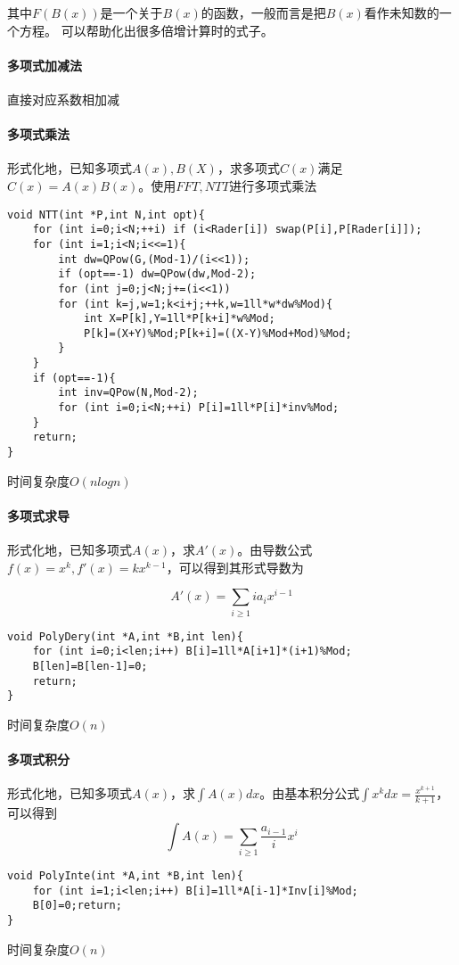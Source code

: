 \documentclass[UTF-8]{ctexart}
\begin{document}
	其中$F(B(x))$是一个关于$B(x)$的函数，一般而言是把$B(x)$看作未知数的一个方程。  
	可以帮助化出很多倍增计算时的式子。
	
	\paragraph{多项式加减法} 直接对应系数相加减
	
	\paragraph{多项式乘法} 形式化地，已知多项式$A(x),B(X)$，求多项式$C(x)$满足$C(x)=A(x)B(x)$。使用$FFT,NTT$进行多项式乘法
\begin{verbatim}
void NTT(int *P,int N,int opt){
    for (int i=0;i<N;++i) if (i<Rader[i]) swap(P[i],P[Rader[i]]);
    for (int i=1;i<N;i<<=1){
        int dw=QPow(G,(Mod-1)/(i<<1));
        if (opt==-1) dw=QPow(dw,Mod-2);
        for (int j=0;j<N;j+=(i<<1))
        for (int k=j,w=1;k<i+j;++k,w=1ll*w*dw%Mod){
            int X=P[k],Y=1ll*P[k+i]*w%Mod;
            P[k]=(X+Y)%Mod;P[k+i]=((X-Y)%Mod+Mod)%Mod;
        }
    }
    if (opt==-1){
        int inv=QPow(N,Mod-2);
        for (int i=0;i<N;++i) P[i]=1ll*P[i]*inv%Mod;
    }
    return;
}
\end{verbatim}
	时间复杂度$O(nlogn)$
	
	\paragraph{多项式求导}形式化地，已知多项式$A(x)$，求$A'(x)$。由导数公式$f(x)=x^k,f'(x)=kx^{k-1}$，可以得到其形式导数为
	
	$$A'(x)=\sum _ {i \ge 1}ia _ {i}x^{i-1}$$
\begin{verbatim}
void PolyDery(int *A,int *B,int len){
    for (int i=0;i<len;i++) B[i]=1ll*A[i+1]*(i+1)%Mod;
    B[len]=B[len-1]=0;
    return;
}
\end{verbatim}
	时间复杂度$O(n)$
	
	\paragraph{多项式积分}形式化地，已知多项式$A(x)$，求$\int A(x)dx$。由基本积分公式$\int x^kdx=\frac{x^{k+1}}{k+1}$，可以得到
	$$\int A(x)=\sum _ {i \ge 1}\frac{a _ {i-1}}{i}x^i$$
\begin{verbatim}
void PolyInte(int *A,int *B,int len){
    for (int i=1;i<len;i++) B[i]=1ll*A[i-1]*Inv[i]%Mod;
    B[0]=0;return;
}
\end{verbatim}
	时间复杂度$O(n)$
	
\end{document}
